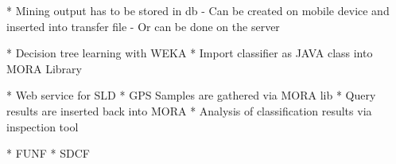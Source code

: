 \documentclass[times, 10pt,twocolumn]{article}
\begin{document}
* Mining output has to be stored in db
  - Can be created on mobile device and inserted into transfer file
  - Or can be done on the server


 \label{sec:HAR}
* Decision tree learning with WEKA
* Import classifier as JAVA class into MORA Library

* Web service for SLD
* GPS Samples are gathered via MORA lib
* Query results are inserted back into MORA
* Analysis of classification results via inspection tool


* FUNF
* SDCF


\nocite{ex1,ex2}


\end{document}
